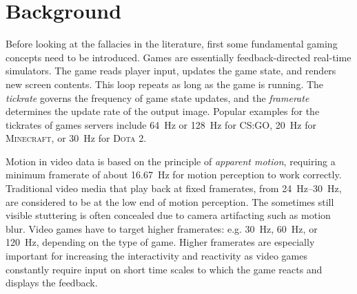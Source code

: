 \section{Background}
\label{sec:background}

Before looking at the fallacies in the literature, first some fundamental gaming concepts need to be introduced. Games are essentially feedback-directed real-time simulators. The game reads player input, updates the game state, and renders new screen contents. This loop repeats as long as the game is running. The \textit{tickrate} governs the frequency of game state updates, and the \textit{framerate} determines the update rate of the output image. Popular examples for the tickrates of games servers include \SI{64}{\hertz} or \SI{128}{\hertz} for \textsc{CS:GO}, \SI{20}{\hertz} for \textsc{Minecraft}, or \SI{30}{\hertz} for \textsc{Dota 2}.

Motion in video data is based on the principle of \textit{apparent motion}, requiring a minimum framerate of about \SI{16.67}{\hertz} for motion perception to work correctly. Traditional video media that play back at fixed framerates, from \SIrange{24}{30}{\hertz}, are considered to be at the low end of motion perception. The sometimes still visible stuttering is often concealed due to camera artifacting such as motion blur. Video games have to target higher framerates: e.g. \SI{30}{\hertz}, \SI{60}{\hertz}, or \SI{120}{\hertz}, depending on the type of game. Higher framerates are especially important for increasing the interactivity and reactivity as video games constantly require input on short time scales to which the game reacts and displays the feedback.

